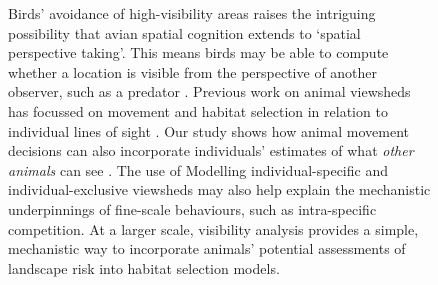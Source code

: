 \begin{refsection}
\begin{figure}[!h]
Birds' avoidance of high-visibility areas raises the intriguing possibility that avian spatial cognition extends to `spatial perspective taking'.
This means birds may be able to compute whether a location is visible from the perspective of another observer, such as a predator \cite{olsoy2015}.
Previous work on animal viewsheds has focussed on movement and habitat selection in relation to individual lines of sight \cite{krams2001,aben2021}.
Our study shows how animal movement decisions can also incorporate individuals' estimates of what \textit{other animals} can see \cite{kopp1998}.
The use of 
Modelling individual-specific and individual-exclusive viewsheds may also help explain the mechanistic underpinnings of fine-scale behaviours, such as intra-specific competition.
At a larger scale, visibility analysis provides a simple, mechanistic way to incorporate animals' potential assessments of landscape risk into habitat selection models.








\end{figure}
\end{refsection}
